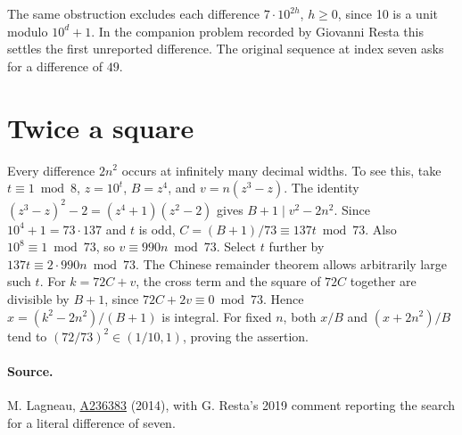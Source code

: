 \documentclass[11pt,letterpaper]{article}
\newcommand{\oeis}[1]{\href{https://oeis.org/A#1}{A#1}}
\begin{document}
The same obstruction excludes each difference \(7\cdot10^{2h}\), \(h\ge0\), since 10 is a unit modulo \(10^d+1\). In the companion problem recorded by Giovanni Resta this settles the first unreported difference. The original sequence at index seven asks for a difference of \(49\).

\section{Twice a square}
Every difference \(2n^2\) occurs at infinitely many decimal widths. To see this, take \(t\equiv1\bmod8\), \(z=10^t\), \(B=z^4\), and \(v=n(z^3-z)\). The identity \((z^3-z)^2-2=(z^4+1)(z^2-2)\) gives \(B+1\mid v^2-2n^2\). Since \(10^4+1=73\cdot137\) and \(t\) is odd, \(C=(B+1)/73\equiv137t\bmod73\). Also \(10^8\equiv1\bmod73\), so \(v\equiv990n\bmod73\). Select \(t\) further by \(137t\equiv2\cdot990n\bmod73\). The Chinese remainder theorem allows arbitrarily large such \(t\). For \(k=72C+v\), the cross term and the square of \(72C\) together are divisible by \(B+1\), since \(72C+2v\equiv0\bmod73\). Hence \(x=(k^2-2n^2)/(B+1)\) is integral. For fixed \(n\), both \(x/B\) and \((x+2n^2)/B\) tend to \((72/73)^2\in(1/10,1)\), proving the assertion.

\paragraph{Source.}
M. Lagneau, \oeis{236383} (2014), with G. Resta's 2019 comment reporting the search for a literal difference of seven.
\end{document}
